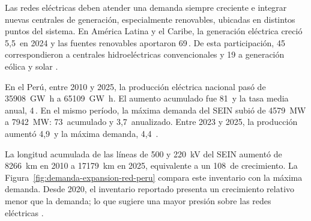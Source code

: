 Las redes eléctricas deben atender una demanda siempre creciente e integrar nuevas centrales de generación, especialmente renovables, ubicadas en distintos puntos del sistema. En América Latina y el Caribe, la generación eléctrica creció 5,5\,\pct{} en 2024 y las fuentes renovables aportaron 69\,\pct{}. De esta participación, 45\,\pct{} correspondieron a centrales hidroeléctricas convencionales y 19 a generación eólica y solar \parencite{olade2025generacionALC2024}.

En el Perú, entre 2010 y 2025, la producción eléctrica nacional pasó de \SI{35908}{\giga\watt\hour} a \SI{65109}{\giga\watt\hour}. El aumento acumulado fue 81\,\pct{} y la tasa media anual, 4\,\pct{}. En el mismo período, la máxima demanda del SEIN subió de \SI{4579}{\mega\watt} a \SI{7942}{\mega\watt}: 73\,\pct{} acumulado y 3,7\,\pct{} anualizado. Entre 2023 y 2025, la producción aumentó 4,9\,\pct{} y la máxima demanda, 4,4\,\pct{} \parencites[sec.~10.4]{minem2025anuario2024}[cuadro~4]{minem2025indicadoresDiciembre}{coesMaximaDemanda}.

La longitud acumulada de las líneas de 500 y \SI{220}{\kilo\volt} del SEIN aumentó de \SI{8266}{\kilo\metre} en 2010 a \SI{17179}{\kilo\metre} en 2025, equivalente a un 108\,\pct{} de crecimiento. La Figura~\ref{fig:demanda-expansion-red-peru} compara este inventario con la máxima demanda. Desde 2020, el inventario reportado presenta un crecimiento relativo menor que la demanda; lo que sugiere una mayor presión sobre las redes eléctricas \parencites{coesEstadisticasAnuales}{coesMaximaDemanda}.

